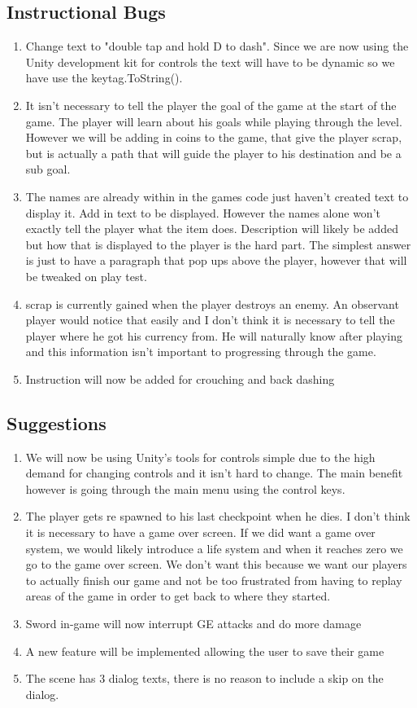 \documentclass{article}
\begin{document}
\subsection*{Instructional Bugs}
\begin{enumerate}
	\item Change text to "double tap and hold D to dash". Since we are now using the Unity development kit for controls the text will have to be dynamic so we have use the keytag.ToString().
	 \item It isn't necessary to tell the player the goal of the game at the start of the game. The player will learn about his goals while playing through the level. However we will be adding in coins to the game, that give the player scrap, but is actually a path that will guide the player to his destination and be a sub goal.
	 	\item The names are already within in the games code just haven't created text to display it. Add in text to be displayed. However the names alone won't exactly tell the player what the item does. Description will likely be added but how that is displayed to the player is the hard part. The simplest answer is just to have a paragraph that pop ups above the player, however that will be tweaked on play test.
	 		\item scrap is currently gained when the player destroys an enemy. An observant player would notice that easily and I don't think it is necessary to tell the player where he got his currency from. He will naturally know after playing and this information isn't important to progressing through the game. 
	 			\item Instruction will now be added for crouching and back dashing 
\end{enumerate}
\subsection*{Suggestions}
\begin{enumerate}
	\item We will now be using Unity's tools for controls simple due to the high demand for changing controls and it isn't hard to change. The main benefit however is going through the main menu using the control keys.
		\item The player gets re spawned to his last checkpoint when he dies. I don't think it is necessary to have a game over screen. If we did want a game over system, we would likely introduce a life system and when it reaches zero we go to the game over screen. We don't want this because we want our players to actually finish our game and not be too frustrated from having to replay areas of the game in order to get back to where they started. 
			\item Sword in-game will now interrupt GE attacks and do more damage
				\item A new feature will be implemented allowing the user to save their game
					\item The scene has 3 dialog texts, there is no reason to include a skip on the dialog.
\end{enumerate}
\end{document}
